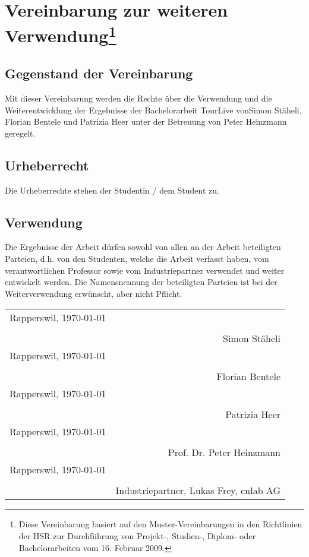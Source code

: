 \chapter*{Vereinbarung zur weiteren Verwendung\footnote{Diese Vereinbarung basiert auf den Muster-Vereinbarungen in den Richtlinien der HSR zur Durchführung von Projekt-, Studien-, Diplom- oder Bachelorarbeiten vom 16. Februar 2009.} }

\section{Gegenstand der Vereinbarung}
Mit dieser Vereinbarung werden die Rechte über die Verwendung und die Weiterentwicklung der Ergebnisse der Bachelorarbeit TourLive vonSimon Stäheli, Florian Bentele und Patrizia Heer unter der Betreuung von Peter Heinzmann geregelt.

\section{Urheberrecht}
Die Urheberrechte stehen der Studentin / dem Student zu.

\section{Verwendung}
Die Ergebnisse der Arbeit dürfen sowohl von allen an der Arbeit beteiligten Parteien, d.h. von den Studenten, welche die Arbeit verfasst haben, vom verantwortlichen Professor sowie vom Industriepartner verwendet und weiter entwickelt werden. Die Namensnennung der beteiligten Parteien ist bei der Weiterverwendung erwünscht, aber nicht Pflicht.

\begin{tabular}{lr}
	Rapperswil, \today \\
	\vspace{10 mm} \\
	\hline 
	
	& Simon Stäheli \\
	Rapperswil, \today \\
	\vspace{10 mm} \\
	\hline 
	
	& Florian Bentele \\
	Rapperswil, \today \\
	\vspace{10 mm} \\
	\hline 
	
	& Patrizia Heer\\
	Rapperswil, \today \\
	\vspace{10 mm} \\
	\hline 
	
	& Prof. Dr. Peter Heinzmann \\
	Rapperswil, \today \\
	\vspace{10 mm} \\
	\hline 
	
	& Industriepartner, Lukas Frey, cnlab AG

\end{tabular}